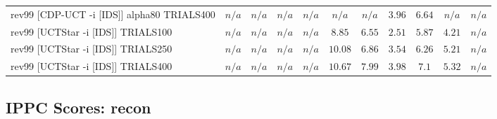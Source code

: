 \documentclass{article}
\begin{document}
\begin{tabular}{|l|r@{$\pm$}rr@{$\pm$}rr@{$\pm$}rr@{$\pm$}rr@{$\pm$}rr@{$\pm$}rr@{$\pm$}rr@{$\pm$}rr@{$\pm$}rr@{$\pm$}r|}
\\
rev99 [CDP-UCT -i [IDS]] alpha80 TRIALS400
& \multicolumn{2}{c}{\textbf{$n/a$}}
& \multicolumn{2}{c}{\textbf{$n/a$}}
& \multicolumn{2}{c}{\textbf{$n/a$}}
& \multicolumn{2}{c}{\textbf{$n/a$}}
& \multicolumn{2}{c}{\textbf{$n/a$}}
& \multicolumn{2}{c}{\textbf{$n/a$}}
& \multicolumn{2}{c}{$3.96$}
& \multicolumn{2}{c}{$6.64$}
& \multicolumn{2}{c}{\textbf{$n/a$}}
& \multicolumn{2}{c|}{\textbf{$n/a$}}
\\
rev99 [UCTStar -i [IDS]] TRIALS100
& \multicolumn{2}{c}{\textbf{$n/a$}}
& \multicolumn{2}{c}{\textbf{$n/a$}}
& \multicolumn{2}{c}{\textbf{$n/a$}}
& \multicolumn{2}{c}{\textbf{$n/a$}}
& \multicolumn{2}{c}{$8.85$}
& \multicolumn{2}{c}{$6.55$}
& \multicolumn{2}{c}{$2.51$}
& \multicolumn{2}{c}{$5.87$}
& \multicolumn{2}{c}{$4.21$}
& \multicolumn{2}{c|}{\textbf{$n/a$}}
\\
rev99 [UCTStar -i [IDS]] TRIALS250
& \multicolumn{2}{c}{\textbf{$n/a$}}
& \multicolumn{2}{c}{\textbf{$n/a$}}
& \multicolumn{2}{c}{\textbf{$n/a$}}
& \multicolumn{2}{c}{\textbf{$n/a$}}
& \multicolumn{2}{c}{$10.08$}
& \multicolumn{2}{c}{$6.86$}
& \multicolumn{2}{c}{$3.54$}
& \multicolumn{2}{c}{$6.26$}
& \multicolumn{2}{c}{$5.21$}
& \multicolumn{2}{c|}{\textbf{$n/a$}}
\\
rev99 [UCTStar -i [IDS]] TRIALS400
& \multicolumn{2}{c}{\textbf{$n/a$}}
& \multicolumn{2}{c}{\textbf{$n/a$}}
& \multicolumn{2}{c}{\textbf{$n/a$}}
& \multicolumn{2}{c}{\textbf{$n/a$}}
& \multicolumn{2}{c}{$10.67$}
& \multicolumn{2}{c}{$7.99$}
& \multicolumn{2}{c}{$3.98$}
& \multicolumn{2}{c}{$7.1$}
& \multicolumn{2}{c}{$5.32$}
& \multicolumn{2}{c|}{\textbf{$n/a$}}
\\
\hline
\end{tabular}%

\bigskip

\subsection*{IPPC Scores: recon}
\end{document}
